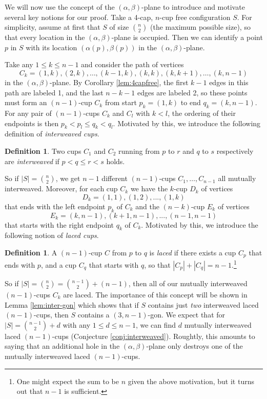\documentclass{amsart}
\theoremstyle{definition}
\newtheorem{definition}[thm]{Definition}
\numberwithin{thm}{section}
\begin{document}
We will now use the concept of the $(\alpha, \beta)$-plane to introduce and motivate several key notions for our proof.
Take a 4-cap, $n$-cup free configuration $S$.
For simplicity, assume at first that $S$ of size $\binom{n}{2}$ (the maximum possible size), so that every location in the $(\alpha, \beta)$-plane is occupied.
Then we can identify a point $p$ in $S$ with its location $(\alpha(p), \beta(p))$ in the $(\alpha, \beta)$-plane.

Take any $1 \leq k \leq n-1$ and consider the path of vertices 
$$C_k = (1,k), (2,k), \dots, (k-1, k), (k,k), (k, k+1), \dots, (k, n-1)$$ 
in the $(\alpha, \beta)$-plane.
By Corollary \ref{lem:4capfree}, the first $k-1$ edges in this path are labeled 1, and the last $n-k-1$ edges are labeled 2, so these points must form an $(n-1)$-cup $C_k$ from start $p_k = (1, k)$ to end $q_k = (k, n - 1)$.
For any pair of $(n-1)$-cups $C_{k}$ and $C_{l}$ with $k < l$, the ordering of their endpoints is then $p_{k} < p_{l} \leq q_{k} < q_{l}$.
Motivated by this, we introduce the following definition of \emph{interweaved cups}.
\begin{definition}
\label{def:inter-laced}
Two cups $C_1$ and $C_2$ running from $p$ to $r$ and $q$ to $s$ respectively are \emph{interweaved} if $p < q \leq r < s$ holds.
\end{definition}
So if $|S| = \binom{n}{2}$, we get $n-1$ different $(n-1)$-cups $C_1, \dots, C_{n-1}$ all mutually interweaved.
Moreover, for each cup $C_k$ 
we have the $k$-cup $D_k$ of vertices 
$$D_k = (1,1), (1,2), ..., (1,k)$$
that ends with the left endpoint $p_k$ of $C_k$ and the $(n-k)$-cup $E_k$ of vertices 
$$E_k = (k, n-1), (k+1, n-1), ..., (n-1, n-1)$$
that starts with the right endpoint $q_k$ of $C_k$. 
Motivated by this, we introduce the following notion of \emph{laced cups}.
\begin{definition}
\label{def:laced}
A $(n-1)$-cup $C$ from $p$ to $q$ is \emph{laced} if there exists a cup $C_p$ that ends with $p$, and a cup $C_q$ that starts with $q$, so that $|C_p| + |C_q| = n - 1$.\footnote{One might expect the sum to be $n$ given the above motivation, but it turns out that $n-1$ is sufficient.}
\end{definition}
So if $|S| = \binom{n}{2} = \binom{n-1}{2} + (n - 1)$, then all of our mutually interweaved $(n-1)$-cups $C_k$ are laced.
The importance of this concept will be shown in Lemma \ref{lem:inter-gon} which shows that if $S$ contains just \emph{two} interweaved laced $(n-1)$-cups, then $S$ contains a $(3,n-1)$-gon.
We expect that for $|S| = \binom{n-1}{2} + d$ with any $1 \leq d \leq n - 1$, we can find $d$ mutually interweaved laced $(n-1)$-cups (Conjecture \ref{conj:interweaved}). 
Roughtly, this amounts to saying that an additional hole in the $(\alpha, \beta)$-plane only destroys one of the mutually interweaved laced $(n-1)$-cups.
\end{document}
